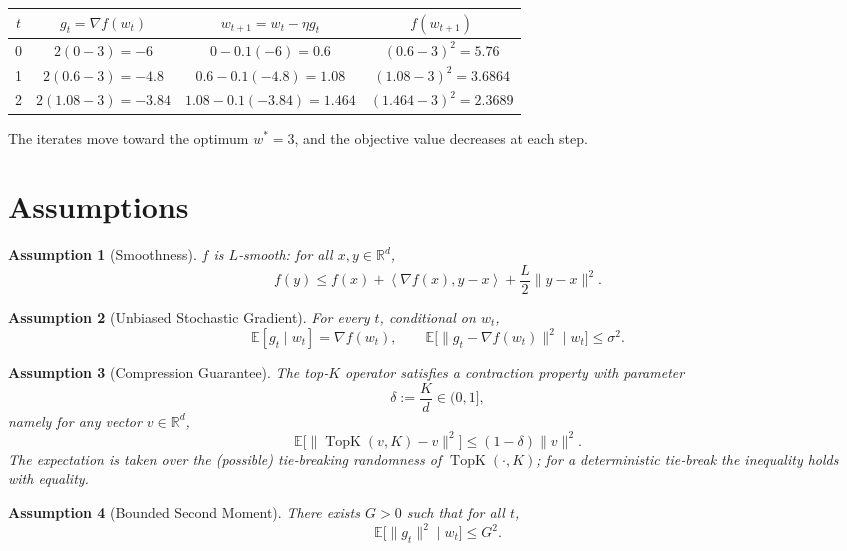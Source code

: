 \documentclass{article}
\newtheorem{assumption}{Assumption}
\newcommand{\TopK}[2]{\operatorname{TopK}\!\left(#1,#2\right)}
\newcommand{\E}{\mathbb{E}}
\newcommand{\R}{\mathbb{R}}
\newcommand{\ip}[2]{\left\langle #1,#2\right\rangle}
\begin{document}
\begin{tabular}{c|c|c|c}
$t$ & $g_{t}= \nabla f(w_{t})$ & $w_{t+1}=w_{t}-\eta g_{t}$ & $f(w_{t+1})$ \\ \hline
0 & $2(0-3)=-6$ & $0-0.1(-6)=0.6$ & $(0.6-3)^{2}=5.76$\\
1 & $2(0.6-3)=-4.8$ & $0.6-0.1(-4.8)=1.08$ & $(1.08-3)^{2}=3.6864$\\
2 & $2(1.08-3)=-3.84$ & $1.08-0.1(-3.84)=1.464$ & $(1.464-3)^{2}=2.3689$\\
\end{tabular}

The iterates move toward the optimum $w^{*}=3$, and the objective value decreases at each step.

\newpage
\section*{Assumptions}
\begin{assumption}[Smoothness]\label{as:smooth}
$f$ is $L$‑smooth: for all $x,y\in\R^{d}$,
\[
f(y)\le f(x)+\ip{\nabla f(x)}{y-x}+\frac{L}{2}\|y-x\|^{2}.
\]
\end{assumption}

\begin{assumption}[Unbiased Stochastic Gradient]\label{as:unbiased}
For every $t$, conditional on $w_{t}$,
\[
\E[g_{t}\mid w_{t}]=\nabla f(w_{t}),\qquad 
\E\!\big[\|g_{t}-\nabla f(w_{t})\|^{2}\mid w_{t}\big]\le \sigma^{2}.
\]
\end{assumption}

\begin{assumption}[Compression Guarantee]\label{as:compress}
The top‑$K$ operator satisfies a \emph{contraction} property with parameter
\[
\delta:=\frac{K}{d}\in(0,1],
\]
namely for any vector $v\in\R^{d}$,
\[
\E\!\big[\|\TopK{v}{K}-v\|^{2}\big]\le (1-\delta)\|v\|^{2}.
\]
The expectation is taken over the (possible) tie‑breaking randomness of $\TopK{\cdot}{K}$; for a deterministic tie‑break the inequality holds with equality.
\end{assumption}

\begin{assumption}[Bounded Second Moment]\label{as:bounded2}
There exists $G>0$ such that for all $t$,
\[
\E\!\big[\|g_{t}\|^{2}\mid w_{t}\big]\le G^{2}.
\]
\end{assumption}
\end{document}
